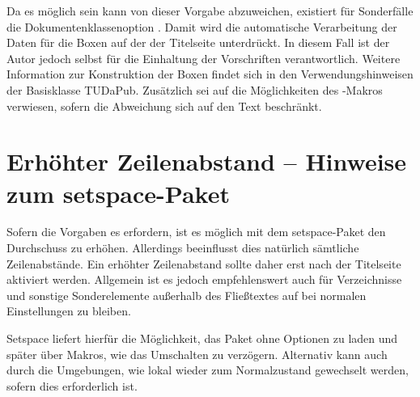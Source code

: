 Da es möglich sein kann von dieser Vorgabe abzuweichen, existiert für Sonderfälle die Dokumentenklassenoption . Damit wird die automatische Verarbeitung der Daten für die Boxen auf der der Titelseite unterdrückt. In diesem Fall ist der Autor jedoch selbst für die Einhaltung der Vorschriften verantwortlich. Weitere Information zur Konstruktion der Boxen findet sich in den Verwendungshinweisen der Basisklasse TUDaPub. Zusätzlich sei auf die Möglichkeiten des -Makros verwiesen, sofern die Abweichung sich auf den Text beschränkt.

\section{Erhöhter Zeilenabstand -- Hinweise zum setspace-Paket}
Sofern die Vorgaben es erfordern, ist es möglich mit dem setspace-Paket den Durchschuss zu erhöhen. Allerdings beeinflusst dies natürlich sämtliche Zeilenabstände. Ein erhöhter Zeilenabstand sollte daher erst nach der Titelseite aktiviert werden. Allgemein ist es jedoch empfehlenswert auch für Verzeichnisse und sonstige Sonderelemente außerhalb des Fließtextes auf bei normalen Einstellungen zu bleiben.

Setspace liefert hierfür die Möglichkeit, das Paket ohne Optionen zu laden und später über Makros, wie  das Umschalten zu verzögern. Alternativ kann auch durch die Umgebungen, wie  lokal wieder zum Normalzustand gewechselt werden, sofern dies erforderlich ist.

